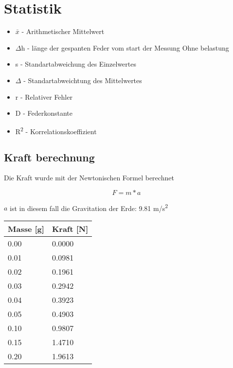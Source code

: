 \documentclass[../main.tex]{subfiles} %
\begin{document}
\section{Statistik}\label{sec:statistik}

\begin{itemize}
    \item $\bar{x}$ - Arithmetischer Mittelwert
    \item $\Delta$h - länge der gespanten Feder vom start der Messung Ohne belastung
    \item s - Standartabweichung des Einzelwertes
    \item $\Delta$ - Standartabweichtung des Mittelwertes
    \item r - Relativer Fehler
    \item D - Federkonstante
    \item R\textsuperscript{2} - Korrelationskoeffizient
\end{itemize}

\subsection{Kraft berechnung}\label{subsec:force-calculation}

Die Kraft wurde mit der Newtonischen Formel berechnet

$$ F = m * a $$

$a$ ist in diesem fall die Gravitation der Erde: 9.81 m/s\textsuperscript{2}

\begin{center}
    \begin{tabular}{ |l|l| } \hline\rowcolor{Gray!50}
        Masse [g] & Kraft [N] \\\hline
        0.00      & 0.0000    \\\hline
        0.01      & 0.0981    \\\hline
        0.02      & 0.1961    \\\hline
        0.03      & 0.2942    \\\hline
        0.04      & 0.3923    \\\hline
        0.05      & 0.4903    \\\hline
        0.10      & 0.9807    \\\hline
        0.15      & 1.4710    \\\hline
        0.20      & 1.9613    \\\hline
    \end{tabular}
\end{center}
\end{document}
